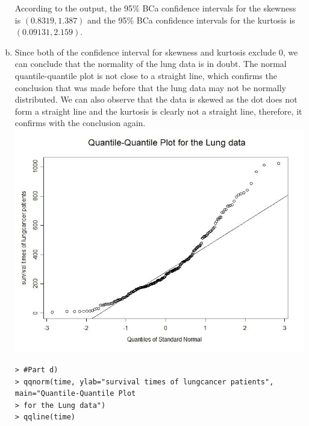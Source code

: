 \documentclass[a4paper,11pt]{article}
\begin{document}
\begin{enumerate}[(a)]
According to the output, the 95\% BCa confidence intervals for the skewness is $(0.8319, 1.387)$ and the 95\% BCa confidence intervals for the kurtosis is $(0.09131, 2.159)$.
\newpage
\item
Since both of the confidence interval for skewness and kurtosis exclude 0, we can conclude that the normality of the lung data is in doubt. The normal quantile-quantile plot is not close to a straight line, which confirms the conclusion that was made before that the lung data may not be normally distributed. We can also observe that the data is skewed as the dot does not form a straight line and the kurtosis is clearly not a straight line, therefore, it confirms with the conclusion again.\\
\includegraphics[scale=0.5]{qqplot.jpg}
\begin{verbatim}
> #Part d)
> qqnorm(time, ylab="survival times of lungcancer patients", main="Quantile-Quantile Plot
> for the Lung data")
> qqline(time)
\end{verbatim}
\end{enumerate}
\newpage
\end{document}
